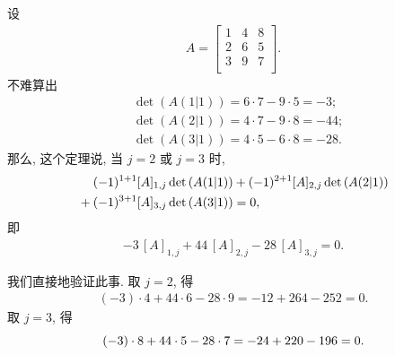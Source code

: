 \documentclass[../libro.tex]{subfiles}
\begin{document}
\begin{example}
    设
    \begin{align*}
        A =
        \begin{bmatrix}
            1 & 4 & 8 \\
            2 & 6 & 5 \\
            3 & 9 & 7 \\
        \end{bmatrix}.
    \end{align*}
    不难算出
    \begin{align*}
        & \det {(A(1|1))} = 6 \cdot 7 - 9 \cdot 5 = -3;  \\
        & \det {(A(2|1))} = 4 \cdot 7 - 9 \cdot 8 = -44; \\
        & \det {(A(3|1))} = 4 \cdot 5 - 6 \cdot 8 = -28.
    \end{align*}
    那么, 这个定理说, 当 \(j = 2\) 或 \(j = 3\) 时,
    \begin{align*}
        & \hphantom{{} + {}}
        (-1)^{1+1} [A]_{1,j} \det {(A(1|1))}
        + (-1)^{2+1} [A]_{2,j} \det {(A(2|1))}
        \\
        &
        + (-1)^{3+1} [A]_{3,j} \det {(A(3|1))} = 0,
    \end{align*}
    即
    \begin{align*}
        -3\,[A]_{1,j} + 44\,[A]_{2,j} - 28\,[A]_{3,j} = 0.
    \end{align*}

    我们直接地验证此事.
    取 \(j = 2\), 得
    \begin{align*}
        (-3) \cdot 4 + 44 \cdot 6 - 28 \cdot 9 = -12 + 264 - 252 = 0.
    \end{align*}
    取 \(j = 3\), 得
    \begin{equation*}
        (-3) \cdot 8 + 44 \cdot 5 - 28 \cdot 7 = -24 + 220 - 196 = 0.
        \qedhere
    \end{equation*}
\end{example}
\end{document}
